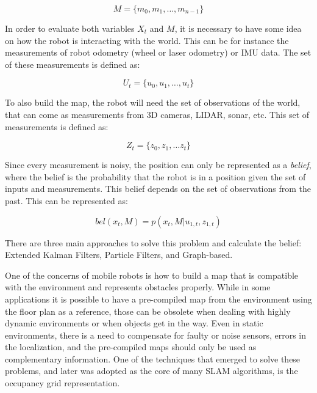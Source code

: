 \begin{equation}
    M = \{m_0, m_1, \dots, m_{n - 1}\}
\end{equation}

In order to evaluate both variables $X_t$ and $M$, it is necessary to have some idea on how the robot is interacting with the world. This can be for instance the measurements of robot odometry (wheel or laser odometry) or IMU data. The set of these measurements is defined as:

\begin{equation}
    U_t = \{u_0, u_1, \dots, u_t\}
\end{equation}

To also build the map, the robot will need the set of observations of the world, that can come as measurements from 3D cameras, LIDAR, sonar, etc. This set of measurements is defined as:

\begin{equation}
    Z_t = \{z_0, z_1, \dots z_t\}
\end{equation}

Since every measurement is noisy, the position can only be represented as a \textit{belief}, where the belief is the probability that the robot is in a position given the set of inputs and measurements. This belief depends on the set of observations from the past. This can be represented as:

\begin{equation}
    bel(x_t, M) = p(x_t, M | u_{1, t}, z_{1,t})
\end{equation}

There are three main approaches to solve this problem and calculate the belief: Extended Kalman Filters, Particle Filters, and Graph-based.

One of the concerns of mobile robots is how to build a map that is compatible with the environment and represents obstacles properly. While in some applications it is possible to have a pre-compiled map from the environment using the floor plan as a reference, those can be obsolete when dealing with highly dynamic environments or when objects get in the way. Even in static environments, there is a need to compensate for faulty or noise sensors, errors in the localization, and the pre-compiled maps should only be used as complementary information. One of the techniques that emerged to solve these problems, and later was adopted as the core of many SLAM algorithms, is the occupancy grid \cite{elfes1989using} representation.

